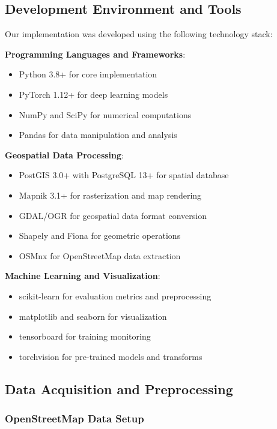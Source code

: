 \subsection{Development Environment and Tools}

Our implementation was developed using the following technology stack:

\textbf{Programming Languages and Frameworks}:
\begin{itemize}
    \item Python 3.8+ for core implementation
    \item PyTorch 1.12+ for deep learning models
    \item NumPy and SciPy for numerical computations
    \item Pandas for data manipulation and analysis
\end{itemize}

\textbf{Geospatial Data Processing}:
\begin{itemize}
    \item PostGIS 3.0+ with PostgreSQL 13+ for spatial database
    \item Mapnik 3.1+ for rasterization and map rendering
    \item GDAL/OGR for geospatial data format conversion
    \item Shapely and Fiona for geometric operations
    \item OSMnx for OpenStreetMap data extraction
\end{itemize}

\textbf{Machine Learning and Visualization}:
\begin{itemize}
    \item scikit-learn for evaluation metrics and preprocessing
    \item matplotlib and seaborn for visualization
    \item tensorboard for training monitoring
    \item torchvision for pre-trained models and transforms
\end{itemize}

\subsection{Data Acquisition and Preprocessing}

\subsubsection{OpenStreetMap Data Setup}

